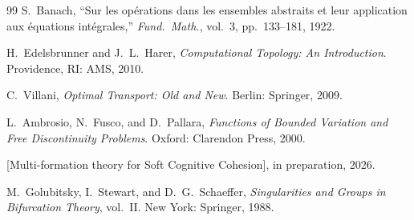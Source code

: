 \documentclass[lettersize,journal]{IEEEtran}
\begin{document}
\begin{thebibliography}{99}
S.~Banach, ``Sur les op\'{e}rations dans les ensembles abstraits et leur application aux \'{e}quations int\'{e}grales,'' \emph{Fund.\ Math.}, vol.~3, pp.~133--181, 1922.

H.~Edelsbrunner and J.~L.~Harer, \emph{Computational Topology: An Introduction}. Providence, RI: AMS, 2010.

C.~Villani, \emph{Optimal Transport: Old and New}. Berlin: Springer, 2009.

L.~Ambrosio, N.~Fusco, and D.~Pallara, \emph{Functions of Bounded Variation and Free Discontinuity Problems}. Oxford: Clarendon Press, 2000.

[Multi-formation theory for Soft Cognitive Cohesion], in preparation, 2026.

M.~Golubitsky, I.~Stewart, and D.~G.~Schaeffer, \emph{Singularities and Groups in Bifurcation Theory}, vol.~II. New York: Springer, 1988.

\end{thebibliography}
\end{document}

